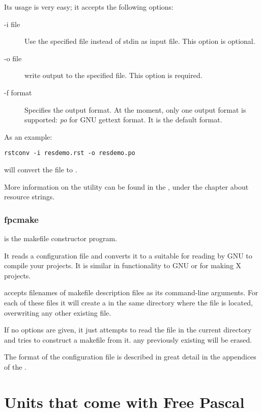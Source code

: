 Its usage is very easy; it accepts the following options:
\begin{description}
\item[-i file] Use the specified file instead of stdin as input file. This
option is optional.
\item[-o file] write output to the specified file. This option is required.
\item[-f format] Specifies the output format. At the moment, only one output
format is supported: {\em po} for GNU gettext  format.
It is the default format.
\end{description}
As an example:
\begin{verbatim}
rstconv -i resdemo.rst -o resdemo.po
\end{verbatim}
will convert the  file to .

More information on the  utility can be found in the \progref,
under the chapter about resource strings.

\subsection{fpcmake}

 is the \fpc makefile constructor program.

It reads a  configuration file and converts it to a
 suitable for reading by GNU  to compile
your projects. It is similar in functionality to GNU 
or  for making X projects.

 accepts filenames of makefile description files as its
command-line arguments. For each of these files it will create a
 in the same directory where the file is located,
overwriting any other existing file.

If no options are given, it just attempts to read the file 
in the current directory and tries to construct a makefile from it.
any previously existing  will be erased.

The format of the  configuration file is described in great
detail in the appendices of the \progref.

\chapter{Units that come with Free Pascal}
\label{ch:Units}

